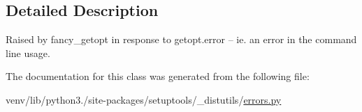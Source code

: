 \subsection{Detailed Description}
\begin{DoxyVerb}Raised by fancy_getopt in response to getopt.error -- ie. an
error in the command line usage.\end{DoxyVerb}
 

The documentation for this class was generated from the following file\+:\begin{DoxyCompactItemize}
\item 
venv/lib/python3./site-\/packages/setuptools/\+\_\+distutils/\hyperlink{__distutils_2errors_8py}{errors.\+py}\end{DoxyCompactItemize}

